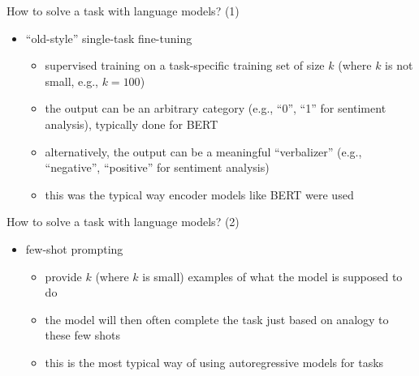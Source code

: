 \begin{frame}{How to solve a task with language models? (1)}

\vfill

\begin{itemize}
    \item ``old-style'' single-task fine-tuning 
        \begin{itemize}
            \item supervised training on a task-specific
        training set of size $k$ (where $k$ is not small,
        e.g., $k=100$)
        \item the output can be an arbitrary category (e.g.,
        ``0'', ``1'' for sentiment analysis), typically done
        for BERT
            \item alternatively, the output can be a
        meaningful ``verbalizer'' (e.g., ``negative'',
        ``positive'' for sentiment analysis)
        \item this was the typical way encoder models like
        BERT were used
        \end{itemize}
\end{itemize}

\vfill

\end{frame}
\begin{frame}{How to solve a task with language models? (2)}

\vfill

\begin{itemize}
    \item few-shot prompting
        \begin{itemize}
            \item provide $k$ (where $k$ is small) examples of what the model is
supposed to do
        \item the model will then often complete the task
        just based on analogy to these few shots
        \item this is the most typical way of using
        autoregressive models for tasks
        \end{itemize}
\end{itemize}

\vfill

\end{frame}

